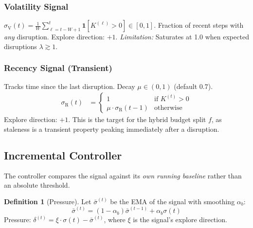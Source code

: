 \documentclass[11pt,a4paper]{article}
\theoremstyle{definition}
\newtheorem{definition}{Definition}[section]
\begin{document}
\subsubsection{Volatility Signal}
$\sigma_{\text{V}}(t) = \frac{1}{W} \sum_{\ell=t-W+1}^{t} \mathbf{1}[K^{(\ell)}>0] \in [0,1]$.
Fraction of recent steps with \emph{any} disruption. Explore direction: $+1$.
\textit{Limitation:} Saturates at 1.0 when expected disruptions $\lambda \gtrsim 1$.

\subsubsection{Recency Signal (Transient)}
Tracks time since the last disruption. Decay $\mu\in(0,1)$ (default $0.7$).
\begin{align}
  \sigma_{\text{R}}(t) &=
  \begin{cases}
    1   & \text{if } K^{(t)} > 0 \\
    \mu \cdot \sigma_{\text{R}}(t-1) & \text{otherwise}
  \end{cases}
\end{align}
Explore direction: $+1$.
This is the target for the hybrid budget split $f$, as staleness is a transient property
peaking immediately after a disruption.

\subsection{Incremental Controller}

The controller compares the signal against its \emph{own running baseline} rather than
an absolute threshold.

\begin{definition}[Pressure]
  Let $\bar\sigma^{(t)}$ be the EMA of the signal with smoothing $\alpha_b$:
  \[
    \bar\sigma^{(t)} = (1-\alpha_b)\bar\sigma^{(t-1)} + \alpha_b\sigma(t)
  \]
  Pressure: $\delta^{(t)} = \xi\cdot\sigma(t) - \bar\sigma^{(t)}$, where $\xi$ is the
  signal's explore direction.
\end{definition}
\end{document}
